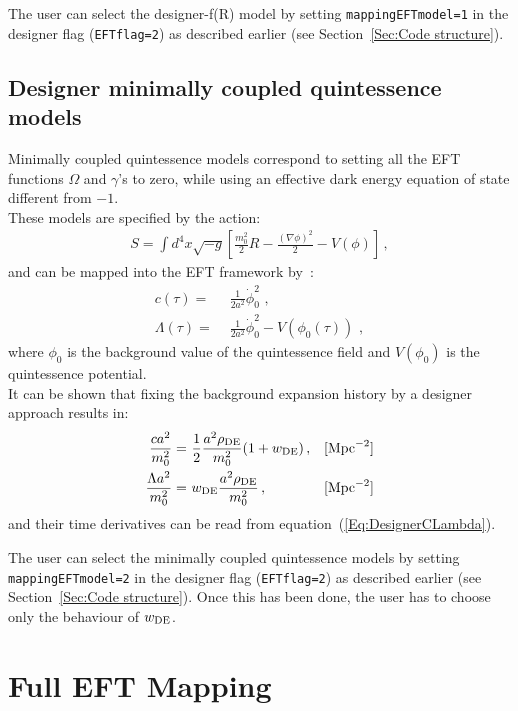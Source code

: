 \documentclass[prd,nofootinbib,showpacs]{revtex4}
\def\l{\left}
\def\r{\right}
\begin{document}
{The user can select the designer-f(R) model by setting  \verb|mappingEFTmodel=1| in the  designer flag (\verb|EFTflag=2|)  as described earlier (see Section~\ref{Sec:Code structure}).


\subsection{Designer minimally coupled quintessence models}\label{SubSec:DesignerMc5e}
%
Minimally coupled quintessence models correspond to setting all the EFT functions $\Omega$ and $\gamma$'s to zero, while using an effective dark energy equation of state different from $-1$. \\
These models are specified by the action:
%
\begin{align}
S = \int{}d^4x\sqrt{-g}\l[\frac{m_0^2}{2}R-\frac{(\nabla\phi)^2}{2}-V(\phi)\r] \,,
\end{align}
%
and can be mapped into the EFT framework by~\cite{Gubitosi:2012hu, Bloomfield:2012ff}:
%
\begin{align}
c(\tau)  =&\,\, \frac{1}{2 a^2} \dot{\phi}_0^2 \,\,, \nonumber \\
\Lambda(\tau) =&\,\, \frac{1}{2a^2} \dot{\phi}_0^2 -V\left(\phi_0(\tau)\right) \,\,,
\end{align}
%
where $\phi_0$ is the background value of the quintessence field and $V\left(\phi_0\right)$ is the quintessence potential. \\
It can be shown that fixing the background expansion history by a designer approach results in:
%
\begin{align}
\frac{c a^2}{m_0^2} =&\,\, \frac{1}{2}\frac{a^2 \rho_{\rm DE}}{m_0^2}(1+w_{\rm DE})\, , & &   [\text{Mpc}^{-2}] \nonumber \\
%
 \frac{\Lambda a^2}{m_0^2} =&\,\,  w_{\rm DE}\frac{a^2\rho_{\rm DE}}{m_0^2}\, , & & [\text{Mpc}^{-2}]  
\end{align}
%
and their time derivatives can be read from equation~(\ref{Eq:DesignerCLambda}). 

The user can select the minimally coupled quintessence models by setting  \verb|mappingEFTmodel=2| in the  designer flag (\verb|EFTflag=2|) as described earlier (see Section~\ref{Sec:Code structure}). Once this has been done, the user has to choose  only the behaviour of $w_{\rm DE}$.

\section{Full EFT Mapping}\label{Fullmapping}

}
\end{document}
